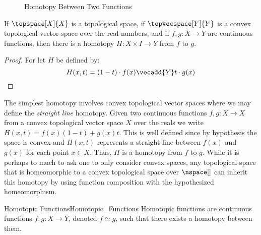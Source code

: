 \documentclass{article}                                                        %
\begin{document}
        \begin{figure}[H]
            \centering
            \captionsetup{type=figure}
            
            \caption{Homotopy Between Two Functions}
            \label{fig:Homotopy_Diagram_for_Depicting_Homotopy}
        \end{figure}
        \begin{theorem}
            If $\topspace[X]{X}$ is a topological space, if
            $\topvecspace[Y]{Y}$ is a convex topological vector space over the
            real numbers, and if $f,g:X\rightarrow{Y}$ are continuous functions,
            then there is a homotopy $H:X\times{I}\rightarrow{Y}$ from $f$ to
            $g$.
        \end{theorem}
        \begin{proof}
            For let $H$ be defined by:
            \begin{equation}
                H(x,t)=(1-t)\cdot{f}(x)\vecadd{Y}t\cdot{g}(x)
            \end{equation}
        \end{proof}
        \begin{example}
            The simplest homotopy involves convex topological vector spaces
            where we may define the \textit{straight line} homotopy. Given two
            continuous functions $f,g:X\rightarrow{X}$ from a convex topological
            vector space $X$ over the reals we write $H(x,t)=f(x)(1-t)+g(x)t$.
            This is well defined since by hypothesis the space is convex and
            $H(x,t)$ represents a straight line between $f(x)$ and $g(x)$ for
            each point $x\in{X}$. Thus, $H$ is a homotopy from $f$ to $g$. While
            it is perhaps to much to ask one to only consider convex spaces, any
            topological space that is homeomorphic to a convex topological space
            over $\nspace[]$ can inherit this homotopy by using function
            composition with the hypothesized homeomorphism.
        \end{example}
        \begin{fdefinition}{Homotopic Functions}{Homotopic_Functions}
            Homotopic functions are continuous functions
            $f,g:{X}\rightarrow{Y}$, denoted ${f}\simeq{g}$,
            such that there exists a homotopy between them.
        \end{fdefinition}
\end{document}
